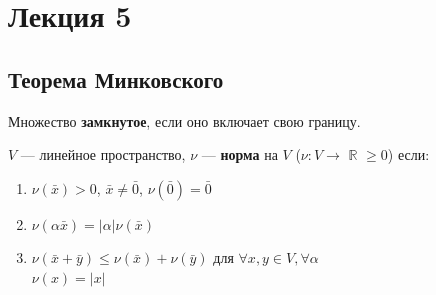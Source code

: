 \newpage
\section{Лекция 5}
\subsection{Теорема Минковского}
\begin{definition} Множество \textbf{замкнутое}, если оно включает свою границу.\end{definition}
\begin{definition}	
$V$ --- линейное пространство, $\nu$ --- \textbf{норма} на $V$ ($\nu : V \to$ $\mathbb{R}$ $\geqslant 0$) если:\begin{enumerate}
    \item $\nu(\bar x) > 0$, $\bar x \neq \bar 0$, $\nu(\bar 0) = \bar 0$
    \item $\nu(\alpha \bar x) = |\alpha|\nu(\bar x)$
    \item $\nu(\bar x + \bar y) \leq \nu(\bar x) + \nu(\bar y)$ для $\forall x, y \in V, \forall \alpha$\\
    $\nu (x) = |x|$\end{enumerate}
\end{definition}

